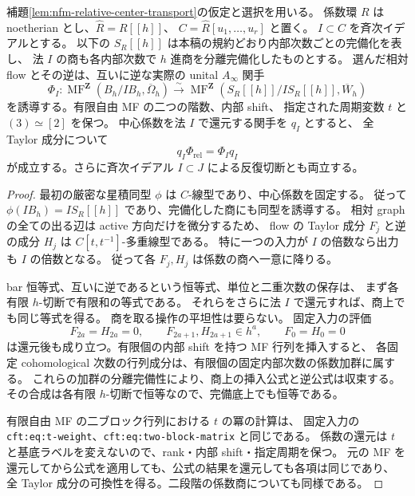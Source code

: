 \begin{proposition}
\label{prop:nfm-completed-central-restriction}
補題\ref{lem:nfm-relative-center-transport}の仮定と選択を用いる。
係数環 $R$ は noetherian とし、$\widehat R=R[[h]]$、
$C=\widehat R[u_1,\ldots,u_r]$ と置く。
$I\subset C$ を斉次イデアルとする。
以下の $S_R[[h]]$ は本稿の規約どおり内部次数ごとの完備化を表し、
法 $I$ の商も各内部次数で $h$ 進商を分離完備化したものとする。
選んだ相対 flow とその逆は、互いに逆な実際の unital $A_\infty$ 関手
\[
 \Phi_I:
 \operatorname{MF}^{\mathbf Z}(B_h/IB_h,\overline\Omega_h)
 \xrightarrow{\sim}
 \operatorname{MF}^{\mathbf Z}
       (S_R[[h]]/IS_R[[h]],\overline W_h)
\]
を誘導する。有限自由 MF の二つの階数、内部 shift、
指定された周期変数 $t$ と $(3)\simeq[2]$ を保つ。
中心係数を法 $I$ で還元する関手を $q_I$ とすると、
全 Taylor 成分について
\[
 q_I\Phi_{\mathrm{rel}}=\Phi_Iq_I
\]
が成立する。さらに斉次イデアル $I\subset J$ による反復切断とも両立する。
\end{proposition}

\begin{proof}
最初の厳密な星積同型 $\phi$ は $C$-線型であり、中心係数を固定する。
従って $\phi(IB_h)=IS_R[[h]]$ であり、完備化した商にも同型を誘導する。
相対 graph の全ての出る辺は active 方向だけを微分するため、
flow の Taylor 成分 $F_j$ と逆の成分 $H_j$ は
$C[t,t^{-1}]$-多重線型である。
特に一つの入力が $I$ の倍数なら出力も $I$ の倍数となる。
従って各 $F_j,H_j$ は係数の商へ一意に降りる。

bar 恒等式、互いに逆であるという恒等式、単位と二重次数の保存は、
まず各有限 $h$-切断で有限和の等式である。
それらをさらに法 $I$ で還元すれば、商上でも同じ等式を得る。
商を取る操作の平坦性は要らない。
固定入力の評価
\[
 F_{2a}=H_{2a}=0,\qquad
 F_{2a+1},H_{2a+1}\in h^a,
 \qquad F_0=H_0=0
\]
は還元後も成り立つ。有限個の内部 shift を持つ MF 行列を挿入すると、
各固定 cohomological 次数の行列成分は、有限個の固定内部次数の係数加群に属する。
これらの加群の分離完備性により、商上の挿入公式と逆公式は収束する。
その合成は各有限 $h$-切断で恒等なので、完備底上でも恒等である。

有限自由 MF の二ブロック行列における $t$ の冪の計算は、
固定入力の \texttt{cft:eq:t-weight}、\texttt{cft:eq:two-block-matrix} と同じである。
係数の還元は $t$ と基底ラベルを変えないので、rank・内部 shift・指定周期を保つ。
元の MF を還元してから公式を適用しても、公式の結果を還元しても各項は同じであり、
全 Taylor 成分の可換性を得る。二段階の係数商についても同様である。
\end{proof}

